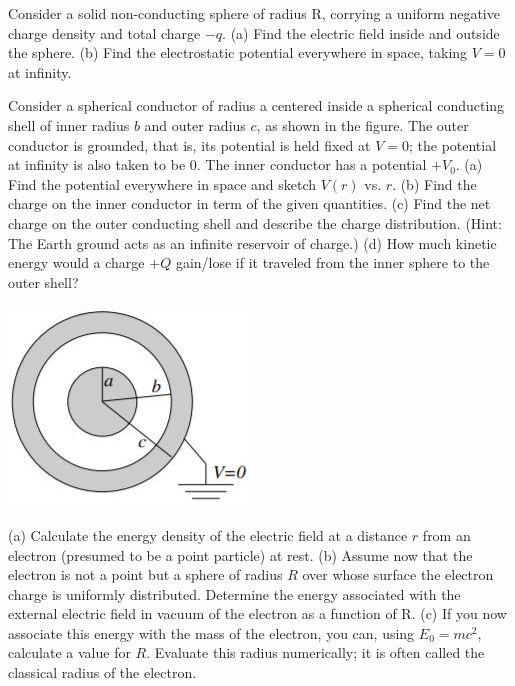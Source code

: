 \documentclass[11pt,letterpaper,boxed]{hmcpset}
\begin{document}
\begin{solution}
\vfill
\end{solution}
\newpage

\begin{problem}
Consider a solid non-conducting sphere of radius R, corrying a uniform negative charge density and total charge $-q$.
(a) Find the electric field inside and outside the sphere.
(b) Find the electrostatic potential everywhere in space, taking $V = 0$ at infinity.
\end{problem}

\begin{solution}
\vfill
\end{solution}
\newpage

\begin{problem}
Consider a spherical conductor of radius a centered inside a spherical conducting shell of inner radius $b$ and outer radius $c$, as shown in the figure. The outer conductor is grounded, that is, its potential is held fixed at $V = 0$; the potential at infinity is also taken to be 0. The inner conductor has a potential $+V_0$.
(a) Find the potential everywhere in space and sketch $V(r)$ vs. $r$.
(b) Find the charge on the inner conductor in term of the given quantities.
(c) Find the net charge on the outer conducting shell and describe the charge distribution. (Hint: The Earth ground acts as an infinite reservoir of charge.)
(d) How much kinetic energy would a charge $+Q$ gain/lose if it traveled from the inner sphere to the outer shell?

	\begin{center}
	\includegraphics[scale=.7]{51m6pic2.jpg}
	\end{center}

\end{problem}

\begin{solution}
\vfill
\end{solution}
\newpage

\begin{problem}
(a) Calculate the energy density of the electric field at a distance $r$ from an electron (presumed
to be a point particle) at rest.
(b) Assume now that the electron is not a point but a sphere of radius $R$ over whose surface the electron charge is uniformly distributed. Determine the energy associated with the external electric field in vacuum of the electron as a function of R.
(c) If you now associate this energy with the mass of the electron, you can, using $E_0 = mc^2$, calculate a value for $R$. Evaluate this radius numerically; it is often called the classical radius of the electron.
\end{problem}
\end{document}
